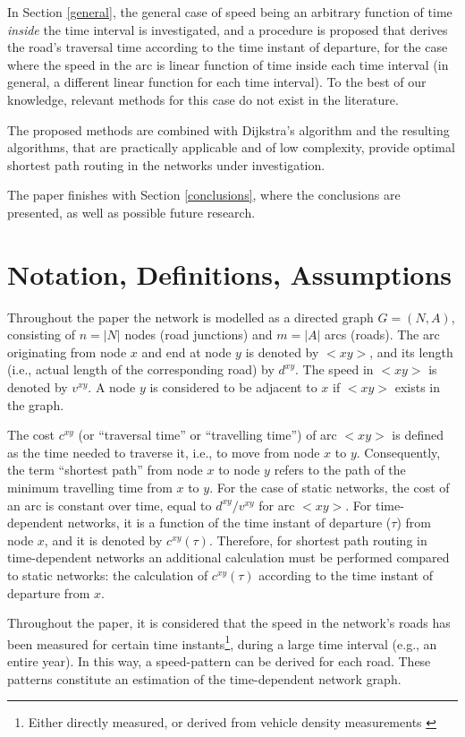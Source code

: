\documentclass[conference]{IEEEtran}
\begin{document}
In Section \ref{general}, the general case of speed being an arbitrary function of time \emph{inside} the time interval is investigated, and a procedure is proposed that derives the road's traversal time according to the time instant of departure, for  the case where the speed in the arc is linear function of time inside each time interval (in general, a different linear function for each time interval). To the best of our knowledge, relevant methods for this case do not exist in the literature.  

The proposed methods are combined with Dijkstra's algorithm and the resulting algorithms, that are practically applicable and of low complexity, provide optimal shortest path routing in the networks under investigation.

The paper finishes with Section \ref{conclusions}, where the conclusions are presented, as well as possible future research.

\section{Notation, Definitions,  Assumptions} \label{def}

Throughout the paper the network is modelled as a directed graph $G=(N, A)$, consisting of $n=|N|$ nodes (road junctions) and $m=|A|$ arcs (roads). The arc originating from node $x$ and end at node $y$ is denoted by $<xy>$,  and its length (i.e., actual length of the corresponding road) by $d^{xy}$. The speed in $<xy>$ is denoted by $v^{xy}$. A node $y$ is considered to be adjacent to $x$ if $<xy>$ exists in the graph.

The cost $c^{xy}$ (or ``traversal time'' or ``travelling time'') of arc $<xy>$ is defined as the time needed to traverse it, i.e., to move from node $x$ to $y$. Consequently, the term ``shortest path'' from node $x$ to node $y$ refers to the path of the minimum travelling time from $x$ to $y$. For the case of static networks, the cost of an arc is constant over time, equal to $d^{xy}/v^{xy}$ for arc $<xy>$. For time-dependent networks, it is a function of the time instant of departure ($\tau$) from node $x$, and it is denoted by $c^{xy}(\tau)$. Therefore, for shortest path routing in time-dependent networks an additional calculation must be performed compared to static networks: the calculation of $c^{xy}(\tau)$ according to the time instant of departure from $x$. 

Throughout the paper, it is considered that the speed in the network's roads has been measured for certain time instants\footnote{Either directly measured, or derived from vehicle density measurements \cite{may}}, during a large time interval (e.g., an entire year). In this way, a speed-pattern can be derived for each road. These patterns constitute an estimation of the time-dependent network graph.   
\end{document}
